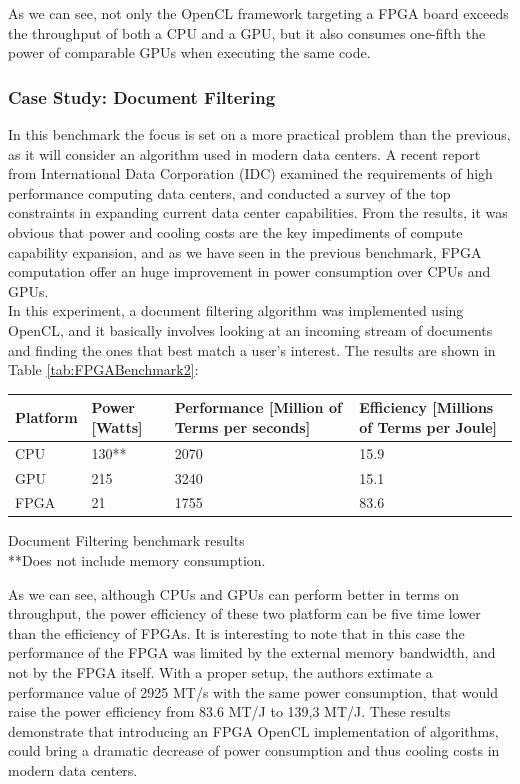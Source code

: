 As we can see, not only the OpenCL framework targeting a FPGA board exceeds the throughput of both a CPU and a GPU, but it also consumes one-fifth the power of comparable GPUs when executing the same code.

\subsubsection{Case Study: Document Filtering}

In this benchmark the focus is set on a more practical problem than the previous, as it will consider an algorithm used in modern data centers.
A recent report \cite{walsh:power} from International Data Corporation (IDC) examined the requirements of high performance computing data centers, and conducted a survey of the top constraints in expanding current data center capabilities. From the results, it was obvious that power and cooling costs are the key impediments of compute capability expansion, and as we have seen in the previous benchmark, FPGA computation offer an huge improvement in power consumption over CPUs and GPUs.\\
In this experiment, a document filtering algorithm was implemented using OpenCL, and it basically involves looking at an incoming stream of documents and finding the ones that best match a user's interest. The results are shown in Table \ref{tab:FPGABenchmark2}:

\begin{tablehere}
{\footnotesize
\begin{tabular}{|p{}|p{}|p{}|p{}|}\hline
\textbf{Platform} & \textbf{Power} [Watts] & \textbf{Performance} [Million of Terms per seconds] & \textbf{Efficiency} [Millions of Terms per Joule]\\ \hline
CPU & 130** & 2070 & 15.9 \\ \hline
GPU & 215 & 3240 & 15.1 \\ \hline
FPGA & 21 & 1755 & 83.6 \\ \hline
\end{tabular}}
  \caption{Document Filtering benchmark results\\ **Does not include memory consumption.}
	\label{tab:FPGABenchmark2}
\end{tablehere}

As we can see, although CPUs and GPUs can perform better in terms on throughput, the power efficiency of these two platform can be five time lower than the efficiency of FPGAs. It is interesting to note that in this case the performance of the FPGA was limited by the external memory bandwidth, and not by the FPGA itself. With a proper setup, the authors extimate a performance value of 2925 MT/s with the same power consumption, that would raise the power efficiency from 83.6 MT/J to 139,3 MT/J.
These results demonstrate that introducing an FPGA OpenCL implementation of algorithms, could bring a dramatic decrease of power consumption and thus cooling costs in modern data centers.


